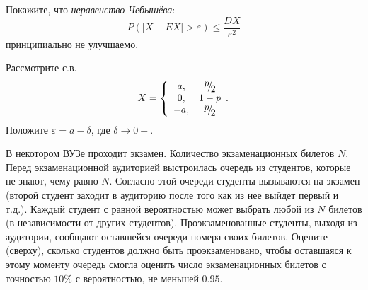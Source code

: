 \begin{problem}
Покажите, что \textit{неравенство Чебышёва}:
\[P\left(\left|X-EX\right|>\varepsilon \right)\le \frac{DX}{\varepsilon ^{2} } \] 
принципиально не улучшаемо.

\begin{ordre} 
Рассмотрите с.в. 
\[X=\left\{\begin{array}{cc} {a,} & {{\raise0.7ex\hbox{$ p $}\!\mathord{\left/ {\vphantom {p 2}} \right. \kern-\nulldelimiterspace}\!\lower0.7ex\hbox{$ 2 $}} } \\ {0,} & {1-p} \\ {-a,} & {{\raise0.7ex\hbox{$ p $}\!\mathord{\left/ {\vphantom {p 2}} \right. \kern-\nulldelimiterspace}\!\lower0.7ex\hbox{$ 2 $}} } \end{array}.\right.\] 
Положите $\varepsilon =a-\delta $, где $\delta \to 0+$.
\end{ordre}

\end{problem}

\begin{problem}
В некотором ВУЗе проходит экзамен. Количество экзаменационных билетов $N$. Перед экзаменационной аудиторией выстроилась очередь из 
студентов, которые не знают, чему равно $N$. Согласно этой очереди студенты вызываются на экзамен (второй студент заходит в аудиторию 
после того как из нее выйдет первый и т.д.). Каждый студент с равной вероятностью может выбрать любой из $N$ билетов (в независимости 
от других студентов). Проэкзаменованные студенты, выходя из аудитории, сообщают оставшейся очереди номера своих билетов. 
Оцените (сверху), сколько студентов должно быть проэкзаменовано, чтобы оставшаяся к этому моменту очередь смогла оценить число 
экзаменационных билетов с точностью $10\%$ с вероятностью, не меньшей $0.95$. 
\end{problem}

